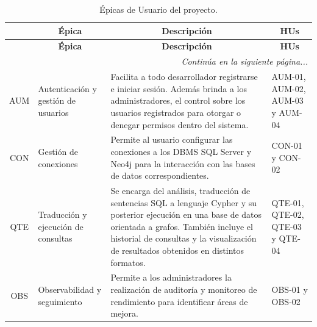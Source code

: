 \begin{longtable}[c]{|c|m{}|m{}|m{}|}
    \caption{Épicas de Usuario del proyecto.}
    \label{tab:epicasDeUsuario} \\
    \hline
    \rowcolor{gray!50}
    \multicolumn{1}{|c|}{\textbf{ID}} & \multicolumn{1}{c|}{\textbf{Épica}} & \multicolumn{1}{c|}{\textbf{Descripción}} & \multicolumn{1}{c|}{\textbf{HUs}} \\
    \hline
    \endfirsthead
    
    \hline
    \rowcolor{gray!50}
    \multicolumn{1}{|c|}{\textbf{ID}} & \multicolumn{1}{c|}{\textbf{Épica}} & \multicolumn{1}{c|}{\textbf{Descripción}} & \multicolumn{1}{c|}{\textbf{HUs}} \\
    \hline
    \endhead
    
    \multicolumn{4}{r}{\textit{Continúa en la siguiente página...}} \\
    \endfoot
    
    \endlastfoot
    
    AUM & Autenticación y gestión de usuarios & Facilita a todo desarrollador registrarse e iniciar sesión. Además brinda a los administradores, el control sobre los usuarios registrados para otorgar o denegar permisos dentro del sistema. & AUM-01, AUM-02, AUM-03 y AUM-04 \\
    \hline
    CON & Gestión de conexiones & Permite al usuario configurar las conexiones a los DBMS SQL Server y Neo4j para la interacción con las bases de datos correspondientes. & CON-01 y CON-02 \\
    \hline
    QTE & Traducción y ejecución de consultas & Se encarga del análisis, traducción de sentencias SQL a lenguaje Cypher y su posterior ejecución en una base de datos orientada a grafos. También incluye el historial de consultas y la visualización de resultados obtenidos en distintos formatos. & QTE-01, QTE-02, QTE-03 y QTE-04 \\
    \hline
    OBS & Observabilidad y seguimiento & Permite a los administradores la realización de auditoría y monitoreo de rendimiento para identificar áreas de mejora. & OBS-01 y OBS-02 \\
    \hline
    
\end{longtable}